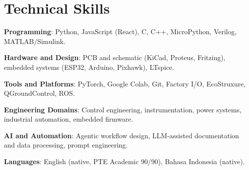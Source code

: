 \section*{Technical Skills}

\noindent
{\small
\textbf{Programming}: Python, JavaScript (React), C, C++, MicroPython, Verilog, MATLAB/Simulink.
\par
\textbf{Hardware and Design}: PCB and schematic (KiCad, Proteus, Fritzing), embedded systems (ESP32, Arduino, Pixhawk), LTspice.
\par
\textbf{Tools and Platforms}: PyTorch, Google Colab, Git, Factory I/O, EcoStruxure, QGroundControl, ROS.
\par
\textbf{Engineering Domains}: Control engineering, instrumentation, power systems, industrial automation, embedded firmware.
\par
\textbf{AI and Automation}: Agentic workflow design, LLM-assisted documentation and data processing, prompt engineering.
\par
\textbf{Languages}: English (native, PTE Academic 90/90), Bahasa Indonesia (native).
\par}
